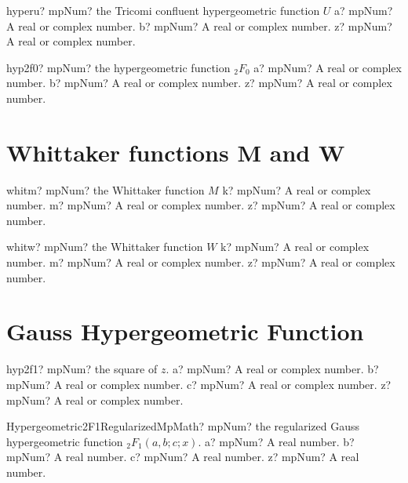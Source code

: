 \documentclass[12pt,a4paper,openany]{book}
\begin{document}
\begin{mpFunctionsExtract}
\mpFunctionThree
{hyperu? mpNum? the Tricomi confluent hypergeometric function $U$}
{a? mpNum? A real or complex number.}
{b? mpNum? A real or complex number.}
{z? mpNum? A real or complex number.}
\end{mpFunctionsExtract}

\begin{mpFunctionsExtract}
\mpFunctionThree
{hyp2f0? mpNum? the hypergeometric function ${}_2F_0$}
{a? mpNum? A real or complex number.}
{b? mpNum? A real or complex number.}
{z? mpNum? A real or complex number.}
\end{mpFunctionsExtract}

\section{Whittaker functions M and W}

\begin{mpFunctionsExtract}
\mpFunctionThree
{whitm? mpNum? the Whittaker function $M$}
{k? mpNum? A real or complex number.}
{m? mpNum? A real or complex number.}
{z? mpNum? A real or complex number.}
\end{mpFunctionsExtract}

\begin{mpFunctionsExtract}
\mpFunctionThree
{whitw? mpNum? the Whittaker function $W$}
{k? mpNum? A real or complex number.}
{m? mpNum? A real or complex number.}
{z? mpNum? A real or complex number.}
\end{mpFunctionsExtract}

\section{Gauss Hypergeometric Function}

\begin{mpFunctionsExtract}
\mpFunctionFour
{hyp2f1? mpNum? the square of $z$.}
{a? mpNum? A real or complex number.}
{b? mpNum? A real or complex number.}
{c? mpNum? A real or complex number.}
{z? mpNum? A real or complex number.}
\end{mpFunctionsExtract}

\begin{mpFunctionsExtract}
\mpFunctionFourNotImplemented
{Hypergeometric2F1RegularizedMpMath? mpNum? the regularized Gauss hypergeometric function ${}_2F_1(a, b; c; x)$.}
{a? mpNum? A real number.}
{b? mpNum? A real number.}
{c? mpNum? A real number.}
{z? mpNum? A real number.}
\end{mpFunctionsExtract}
\end{document}
